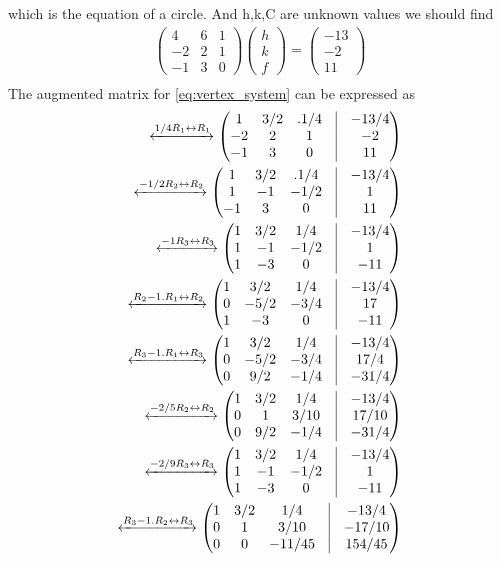 \documentclass[journal,10pt,twocolumn]{article}
\newcommand{\myvec}[1]{\ensuremath{\begin{pmatrix}#1\end{pmatrix}}}
\begin{document}
which is the equation of a circle. 
And h,k,C are unknown values we should find
\begin{align}
	\label{eq:vertex_system}
	\myvec{4&6&1\\-2& 2&1\\-1& 3&0}\myvec{h\\k\\f} = \myvec{-13\\-2 \\11}\\
\end{align}
The augmented matrix for \eqref{eq:vertex_system} can be expressed as
\begin{align}
	\xleftrightarrow[]{1/4 R_1 \leftrightarrow R_1}\myvec{1&3/2&.1/4&\vrule&-13/4\\-2&2&1&\vrule&-2\\-1&3&0&\vrule&11}\\
		\xleftrightarrow[]{-1/2R_2 \leftrightarrow R_2}
		\myvec{1&3/2&.1/4&\vrule&-13/4\\1&-1&-1/2&\vrule&1\\-1&3&0&\vrule&11}\\
	     \xleftrightarrow[]{-1R_3 \leftrightarrow R_3}	
\myvec{1&3/2&1/4&\vrule&-13/4\\1&-1&-1/2&\vrule&1\\1&-3&0&\vrule&-11}\\
		\xleftrightarrow[]{R_2-1.R_1 \leftrightarrow R_2}
		\myvec{1&3/2&1/4&\vrule&-13/4\\0&-5/2&-3/4&\vrule&17\\1&-3&0&\vrule&-11}\\
	     \xleftrightarrow[]{R_3-1.R_1 \leftrightarrow R_3}
	     \myvec{1&3/2&1/4&\vrule&-13/4\\0&-5/2&-3/4&\vrule&17/4\\0&9/2&-1/4&\vrule&-31/4}\\
	     \xleftrightarrow[]{-2/5R_2 \leftrightarrow R_2}
	  \myvec{1&3/2&1/4&\vrule&-13/4\\0&1&3/10&\vrule&17/10\\0&9/2&-1/4&\vrule&-31/4}\\    	
	      \xleftrightarrow[]{-2/9R_3 \leftrightarrow R_3}	
\myvec{1&3/2&1/4&\vrule&-13/4\\1&-1&-1/2&\vrule&1\\1&-3&0&\vrule&-11}\\
		\xleftrightarrow[]{R_3-1.R_2 \leftrightarrow R_3}
\myvec{1&3/2&1/4&\vrule&-13/4\\0&1&3/10&\vrule&-17/10\\0&0&-11/45&\vrule&154/45}\\		

\end{align}
\end{document}
